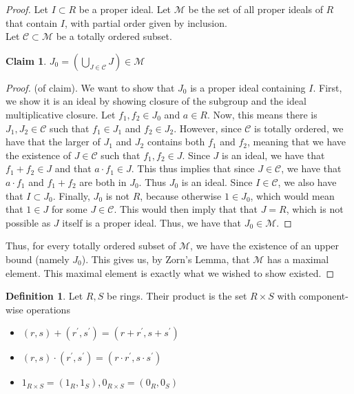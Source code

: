 \documentclass{amsart}
\newtheorem*{claim}{Claim}
\theoremstyle{definition}
\newtheorem{defn}[thm]{Definition}
\theoremstyle{remark}
\begin{document}
\begin{proof}
    Let $I \subset R$ be a proper ideal. Let $\mathcal{M}$ be the set of all proper
    ideals of $R$ that contain $I$, with partial order given by inclusion. \\
    Let $\mathcal{C} \subset \mathcal{M}$ be a totally ordered subset.
    \begin{claim}
        $J_0 = \left(\bigcup\limits_{J \in \mathcal{C}}{J}\right) \in \mathcal{M}$
    \end{claim}
    \begin{proof} (of claim). We want to show that $J_0$ is a proper ideal containing
        $I$. First, we show it is an ideal by showing closure of the subgroup and the
        ideal multiplicative closure. Let $f_1, f_2 \in J_0$ and $a \in R$. Now, this means there
        is $J_1, J_2 \in \mathcal{C}$ such that $f_1 \in J_1$ and $f_2 \in J_2$. However,
        since $\mathcal{C}$ is totally ordered, we have that the larger of $J_1$ and $J_2$
        contains both $f_1$ and $f_2$, meaning that we have the existence of $J \in \mathcal{C}$
        such that $f_1,f_2 \in J$. Since $J$ is an ideal, we have that $f_1 + f_2 \in J$ and that
        $a \cdot f_1 \in J$. This thus implies that since $J \in \mathcal{C}$, we have that
        $a \cdot f_1$ and $f_1 + f_2$ are both in $J_0$. Thus $J_0$ is an ideal. Since $I \in \mathcal{C}$,
        we also have that $I \subset J_0$. Finally, $J_0$ is not $R$, because otherwise $1 \in J_0$,
        which would mean that $1 \in J$ for some $J \in \mathcal{C}$. This would then imply that
        that $J = R$, which is not possible as $J$ itself is a proper ideal. Thus, we have that $J_0 \in \mathcal{M}$.
    \end{proof}
    Thus, for every totally ordered subset of $\mathcal{M}$, we have the existence of an
    upper bound (namely $J_0$). This gives us, by Zorn's Lemma, that $\mathcal{M}$ has
    a maximal element. This maximal element is exactly what we wished to show existed.
\end{proof}
\begin{defn}
Let $R,S$ be rings. Their product is the set $R \times S$ with component-wise
operations
\begin{itemize}
    \item $(r,s) + (r^\prime, s^\prime) = (r + r^\prime, s + s^\prime)$
    \item $(r,s) \cdot  (r^\prime, s^\prime) = (r \cdot r^\prime, s \cdot s^\prime)$
    \item $1_{R \times S} = (1_R, 1_S), 0_{R \times S} = (0_R, 0_S)$
\end{itemize}
\end{defn}
\end{document}
